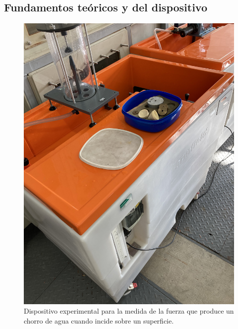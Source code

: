 \documentclass[12pt,a4paper]{article}
\begin{document}
\subsection*{Fundamentos teóricos y del dispositivo}

\begin{figure}[H]
\begin{minipage}[b]{0.6\linewidth}
\centering
\includegraphics[width=\linewidth]{fotos/aparato_4}
\caption{Dispositivo experimental para la medida de la fuerza que produce un chorro de agua cuando incide sobre un superficie.}
\label{fig9}
\end{minipage}
\hspace{0.5cm}
\begin{minipage}[b]{0.4\linewidth}
\centering

\end{minipage}
\end{figure}
\end{document}
